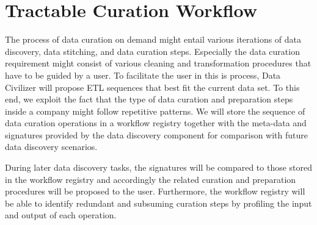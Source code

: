 \section{Tractable Curation Workflow}
\label{sec:workflow}

The process of data curation on demand might entail various iterations of data discovery, data stitching, and data curation steps. Especially the data curation requirement might consist of various cleaning and transformation procedures that have to be guided by a user. To facilitate the user in this is process, Data Civilizer will propose ETL sequences that best fit the current data set.
To this end, we exploit the fact that the type of data curation and preparation steps  inside a company might follow repetitive patterns.
We will store the sequence of data curation operations in a workflow registry together with the meta-data and signatures provided by the data discovery component for comparison with future data discovery scenarios. 

During later data discovery tasks, the signatures will be compared to those stored in the workflow registry and accordingly the related curation and preparation procedures will be proposed to the user. Furthermore, the workflow registry will be able to identify redundant and subsuming curation steps by profiling the input and output of each operation.